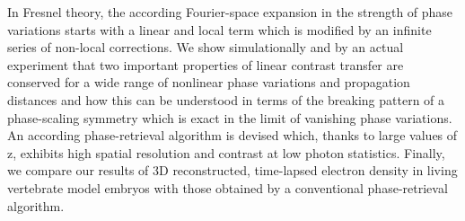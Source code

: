 \documentclass{article}
\begin{document}
In Fresnel theory, the according Fourier-space expansion in the
strength of phase variations starts with a linear and local term which
is modified by an infinite series of non-local corrections. We show
simulationally and by an actual experiment that two important
properties of linear contrast transfer are conserved for a wide range
of nonlinear phase variations and propagation distances and how this
can be understood in terms of the breaking pattern of a phase-scaling
symmetry which is exact in the limit of vanishing phase variations. An
according phase-retrieval algorithm is devised which, thanks to large
values of z, exhibits high spatial resolution and contrast at low
photon statistics. Finally, we compare our results of 3D
reconstructed, time-lapsed electron density in living vertebrate model
embryos with those obtained by a conventional phase-retrieval
algorithm.
\end{document}
